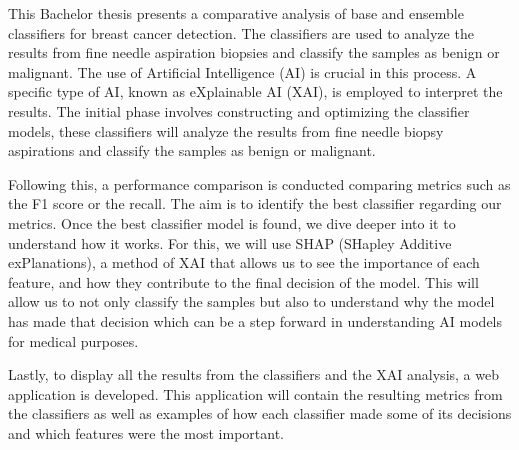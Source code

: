 This Bachelor thesis
presents a comparative analysis of base and ensemble classifiers for breast cancer detection. The classifiers are used to analyze the results from fine needle aspiration biopsies and classify the samples as benign or malignant. The use of Artificial Intelligence (AI) is crucial in this process. A specific type of AI, known as eXplainable AI (XAI), is employed to interpret the results. The initial phase involves constructing and optimizing the classifier models, these classifiers will analyze the results from fine needle biopsy aspirations and classify the samples as benign or malignant.

Following this, a performance comparison is conducted comparing metrics such as the F1 score or the recall. The aim is to identify the best classifier regarding our metrics. Once the best classifier model is found, we dive deeper into it to understand how it works. For this, we will use SHAP (SHapley Additive exPlanations), a method of XAI 
that allows us to see the importance of each feature, and how they contribute to the final decision of the model. This will allow us to not only classify the samples but also to understand why the model has made that decision which can be a step forward in understanding AI models for medical purposes.

Lastly, to display all the results from the classifiers and the XAI analysis, a web application is developed. This application will contain the resulting metrics from the classifiers as well as examples of how each classifier made some of its decisions and which features were the most important.

